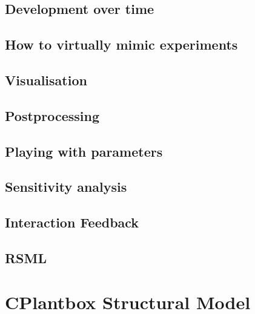 \documentclass[a4paper]{article}
\begin{document}
\subsection{Development over time} \label{ssec:development}


\subsection{How to virtually mimic experiments} \label{ssec:virtual}
% 

\subsection{Visualisation} \label{ssec:visualisation}
% 

\subsection{Postprocessing} \label{ssec:postprocessing}
% 

\subsection{Playing with parameters} \label{ssec:parameters}
% 

\subsection{Sensitivity analysis} \label{ssec:sa}
% 

\subsection{Interaction Feedback} \label{ssec:interaction}
% 

\subsection{RSML} \label{ssec:rsml}
% 



\newpage
\section{CPlantbox Structural Model} \label{sec:cplantobx}
\end{document}
